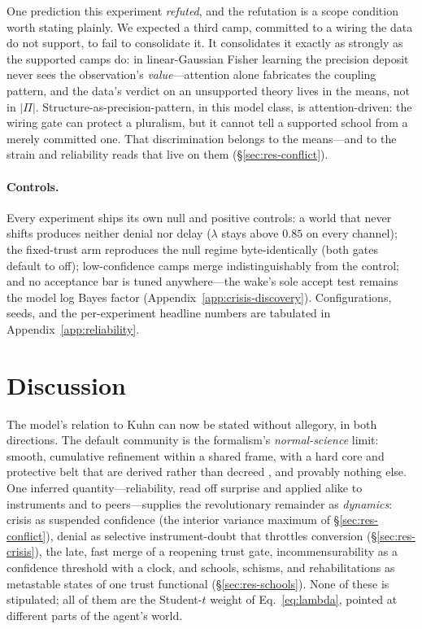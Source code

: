 \documentclass[runningheads]{llncs}
\begin{document}
One prediction this experiment \emph{refuted}, and the refutation is a scope condition worth
stating plainly. We expected a third camp, committed to a wiring the data do not support, to
fail to consolidate it. It consolidates it exactly as strongly as the supported camps do: in
linear-Gaussian Fisher learning the precision deposit never sees the observation's
\emph{value}---attention alone fabricates the coupling pattern, and the data's verdict on an
unsupported theory lives in the means, not in $|\Pi|$. Structure-as-precision-pattern, in this
model class, is attention-driven: the wiring gate can protect a pluralism, but it cannot tell a
supported school from a merely committed one. That discrimination belongs to the means---and to
the strain and reliability reads that live on them (\S\ref{sec:res-conflict}).

\paragraph{Controls.}
Every experiment ships its own null and positive controls: a world that never shifts produces
neither denial nor delay ($\lambda$ stays above $0.85$ on every channel); the fixed-trust arm
reproduces the null regime byte-identically (both gates default to off); low-confidence camps
merge indistinguishably from the control; and no acceptance bar is tuned anywhere---the wake's
sole accept test remains the model log Bayes factor (Appendix~\ref{app:crisis-discovery}).
Configurations, seeds, and the per-experiment headline numbers are tabulated in
Appendix~\ref{app:reliability}.

\section{Discussion}
\label{sec:discussion}

The model's relation to Kuhn can now be stated without allegory, in both directions. The default
community is the formalism's \emph{normal-science} limit: smooth, cumulative refinement within a
shared frame, with a hard core and protective belt that are derived rather than decreed
\citep{lakatos1970}, and provably nothing else. One inferred quantity---reliability, read off
surprise and applied alike to instruments and to peers---supplies the revolutionary remainder as
\emph{dynamics}: crisis as suspended confidence (the interior variance maximum of
\S\ref{sec:res-conflict}), denial as selective instrument-doubt that throttles conversion
(\S\ref{sec:res-crisis}), the late, fast merge of a reopening trust gate, incommensurability as
a confidence threshold with a clock, and schools, schisms, and rehabilitations as metastable
states of one trust functional (\S\ref{sec:res-schools}). None of these is stipulated; all of them are the Student-$t$ weight
of Eq.~\eqref{eq:lambda}, pointed at different parts of the agent's world.
\end{document}
